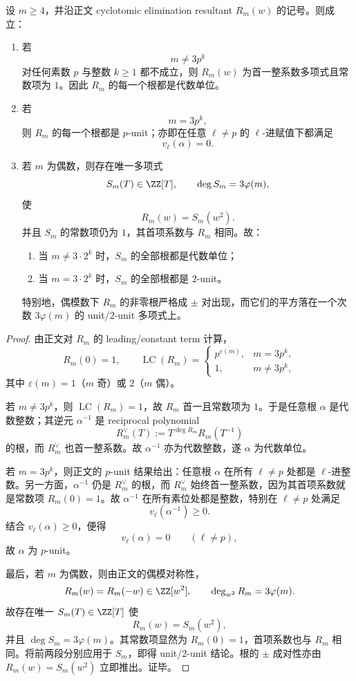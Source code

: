 \begin{theorem}\label{thm:conclusion-cyclotomic-resultant-unit-punit-even-square-compression}
设 \(m\ge 4\)，并沿正文 cyclotomic elimination resultant \(R_m(w)\) 的记号。则成立：
\begin{enumerate}
  \item 若
  \[
  m\neq 3p^k
  \]
  对任何素数 \(p\) 与整数 \(k\ge 1\) 都不成立，则 \(R_m(w)\) 为首一整系数多项式且常数项为 \(1\)。因此 \(R_m\) 的每一个根都是代数单位。
  \item 若
  \[
  m=3p^k,
  \]
  则 \(R_m\) 的每一个根都是 \(p\)-unit；亦即在任意 \(\ell\neq p\) 的 \(\ell\)-进赋值下都满足
  \[
  v_\ell(\alpha)=0.
  \]
  \item 若 \(m\) 为偶数，则存在唯一多项式
  \[
  S_m(T)\in \ZZ[T],
  \qquad
  \deg S_m=3\varphi(m),
  \]
  使
  \[
  R_m(w)=S_m(w^2).
  \]
  并且 \(S_m\) 的常数项仍为 \(1\)，其首项系数与 \(R_m\) 相同。故：
  \begin{enumerate}
    \item 当 \(m\neq 3\cdot 2^k\) 时，\(S_m\) 的全部根都是代数单位；
    \item 当 \(m=3\cdot 2^k\) 时，\(S_m\) 的全部根都是 \(2\)-unit。
  \end{enumerate}
  特别地，偶模数下 \(R_m\) 的非零根严格成 \(\pm\) 对出现，而它们的平方落在一个次数 \(3\varphi(m)\) 的 unit/\(2\)-unit 多项式上。
\end{enumerate}
\end{theorem}
\begin{proof}
由正文对 \(R_m\) 的 leading/constant term 计算，
\[
R_m(0)=1,
\qquad
\operatorname{LC}(R_m)=
\begin{cases}
p^{\varepsilon(m)},& m=3p^k,\\
1,& m\neq 3p^k,
\end{cases}
\]
其中 \(\varepsilon(m)=1\)（\(m\) 奇）或 \(2\)（\(m\) 偶）。

若 \(m\neq 3p^k\)，则 \(\operatorname{LC}(R_m)=1\)，故 \(R_m\) 首一且常数项为 \(1\)。于是任意根 \(\alpha\) 是代数整数；其逆元 \(\alpha^{-1}\) 是 reciprocal polynomial
\[
R_m^\vee(T):=T^{\deg R_m}R_m(T^{-1})
\]
的根，而 \(R_m^\vee\) 也首一整系数。故 \(\alpha^{-1}\) 亦为代数整数，遂 \(\alpha\) 为代数单位。

若 \(m=3p^k\)，则正文的 \(p\)-unit 结果给出：任意根 \(\alpha\) 在所有 \(\ell\neq p\) 处都是 \(\ell\)-进整数。另一方面，\(\alpha^{-1}\) 仍是 \(R_m^\vee\) 的根，而 \(R_m^\vee\) 始终首一整系数，因为其首项系数就是常数项 \(R_m(0)=1\)。故 \(\alpha^{-1}\) 在所有素位处都是整数，特别在 \(\ell\neq p\) 处满足
\[
v_\ell(\alpha^{-1})\ge 0.
\]
结合 \(v_\ell(\alpha)\ge 0\)，便得
\[
v_\ell(\alpha)=0
\qquad (\ell\neq p),
\]
故 \(\alpha\) 为 \(p\)-unit。

最后，若 \(m\) 为偶数，则由正文的偶模对称性，
\[
R_m(w)=R_m(-w)\in \ZZ[w^2],
\qquad
\deg_{w^2}R_m=3\varphi(m).
\]
故存在唯一 \(S_m(T)\in \ZZ[T]\) 使
\[
R_m(w)=S_m(w^2),
\]
并且 \(\deg S_m=3\varphi(m)\)。其常数项显然为 \(R_m(0)=1\)，首项系数也与 \(R_m\) 相同。将前两段分别应用于 \(S_m\)，即得 unit/\(2\)-unit 结论。根的 \(\pm\) 成对性亦由 \(R_m(w)=S_m(w^2)\) 立即推出。证毕。
\end{proof}

